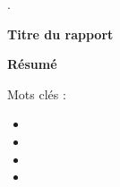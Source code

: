 \begin{titlepage}.
    

    \vspace{3cm}

    \begin{Large}
        \begin{center}
            \textbf{Titre du rapport}
            \makeatletter
            \noindent\@title
            \makeatother
        \end{center}
    \end{Large}

    \vspace{0.5cm}

    \begin{large}
        \begin{center}
            \textbf{Résumé}
        \end{center}

        \makeatletter
        \@abstracttext
        \makeatother
    \end{large}

    \vspace{1.5cm}

    \begin{Large}
        Mots clés :
        \begin{itemize}
            \item \makeatletter \@keywordone \makeatother
            \item \makeatletter \@keywordtwo \makeatother
            \item \makeatletter \@keywordthree \makeatother
            \item \makeatletter \@keywordfour \makeatother
        \end{itemize}
    \end{Large}   
\end{titlepage}